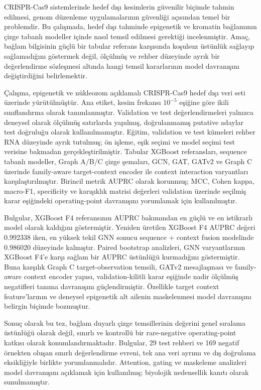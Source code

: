 \documentclass{btu-thesis}
\begin{document}
\begin{BTUabstractTR}
CRISPR-Cas9 sistemlerinde hedef dışı kesimlerin güvenilir biçimde tahmin edilmesi, genom düzenleme uygulamalarının güvenliği açısından temel bir problemdir. Bu çalışmada, hedef dışı tahminde epigenetik ve kromatin bağlamının çizge tabanlı modeller içinde nasıl temsil edilmesi gerektiği incelenmiştir. Amaç, bağlam bilgisinin güçlü bir tabular referans karşısında koşulsuz üstünlük sağlayıp sağlamadığını göstermek değil, ölçülmüş ve rehber düzeyinde ayrık bir değerlendirme sözleşmesi altında hangi temsil kararlarının model davranışını değiştirdiğini belirlemektir.

Çalışma, epigenetik ve nükleozom açıklamalı CRISPR-Cas9 hedef dışı veri seti üzerinde yürütülmüştür. Ana etiket, kesim frekansı \(10^{-5}\) eşiğine göre ikili sınıflandırma olarak tanımlanmıştır. Validation ve test değerlendirmeleri yalnızca deneysel olarak ölçülmüş satırlarda yapılmış, doğrulanmamış putative adaylar test doğruluğu olarak kullanılmamıştır. Eğitim, validation ve test kümeleri rehber RNA düzeyinde ayrık tutulmuş; ön işleme, eşik seçimi ve model seçimi test verisine bakmadan gerçekleştirilmiştir. Tabular XGBoost referansları, sequence tabanlı modeller, Graph A/B/C çizge şemaları, GCN, GAT, GATv2 ve Graph C üzerinde family-aware target-context encoder ile context interaction varyantları karşılaştırılmıştır. Birincil metrik AUPRC olarak korunmuş; MCC, Cohen kappa, macro-F1, specificity ve karışıklık matrisi değerleri validation üzerinde seçilmiş karar eşiğindeki operating-point davranışını yorumlamak için kullanılmıştır.

Bulgular, XGBoost F4 referansının AUPRC bakımından en güçlü ve en istikrarlı model olarak kaldığını göstermiştir. Yeniden üretilen XGBoost F4 AUPRC değeri 0.992338 iken, en yüksek tekil GNN sonucu sequence + context fusion modelinde 0.986020 düzeyinde kalmıştır. Paired bootstrap analizleri, GNN varyantlarının XGBoost F4'e karşı sağlam bir AUPRC üstünlüğü kurmadığını göstermiştir. Buna karşılık Graph C target-observation temsili, GATv2 mesajlaşması ve family-aware context encoder yapısı, validation-kilitli karar eşiğinde nadir ölçülmüş negatifleri tanıma davranışını güçlendirmiştir. Özellikle target context feature'larının ve deneysel epigenetik alt ailenin maskelenmesi model davranışını belirgin biçimde bozmuştur.

Sonuç olarak bu tez, bağlam duyarlı çizge temsillerinin değerini genel sıralama üstünlüğü olarak değil, sınırlı ve kontrollü bir rare-negative operating-point katkısı olarak konumlandırmaktadır. Bulgular, 29 test rehberi ve 169 negatif örnekten oluşan sınırlı değerlendirme evreni, tek ana veri ayrımı ve dış doğrulama eksikliğiyle birlikte yorumlanmalıdır. Attention, gating ve maskeleme analizleri model davranışını açıklamak için kullanılmış; biyolojik nedensellik kanıtı olarak sunulmamıştır.
\end{BTUabstractTR}
\end{document}
